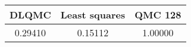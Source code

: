 \begin{tabular}{|c|c|c|}
\hline
DLQMC&Least squares&QMC 128\\ 
\hline

0.29410 & 0.15112 & 1.00000\\ 
\hline
\end{tabular}

